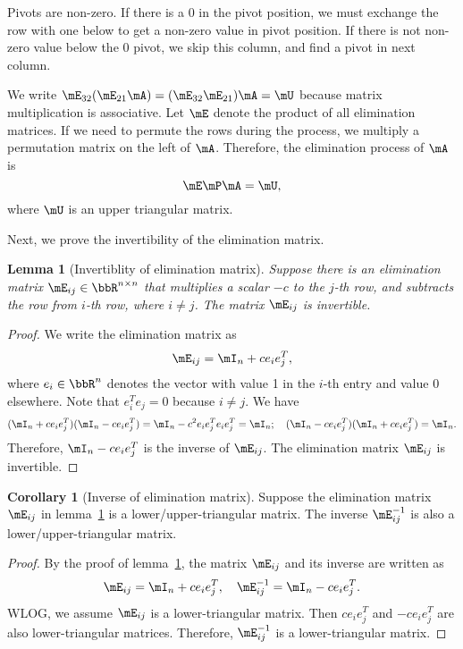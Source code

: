 \documentclass[11pt]{article}
\theoremstyle{plain}
\newtheorem{lem}{Lemma}
\theoremstyle{definition}
\newtheorem{cor}{Corollary}
\begin{document}
Pivots are non-zero. If there is a 0 in the pivot position, we must exchange the row with one below to get a non-zero value in pivot position. If there is not non-zero value below the 0 pivot, we skip this column, and find a pivot in next column. 

\vspace{.2cm}
We write $\mE_{32} (\mE_{21} \mA) = (\mE_{32} \mE_{21} ) \mA = \mU$ because matrix multiplication is associative. Let $\mE$ denote the product of all elimination matrices. If we need to permute the rows during the process, we multiply a permutation matrix on the left of $\mA$. Therefore, the elimination process of $\mA$ is
\begin{equation}\label{eq:factor}
	\mE \mP \mA = \mU,
\end{equation}
 where  $\mU$ is an upper triangular matrix.


\vspace{.2cm}
Next, we prove the invertibility of the elimination matrix.
\begin{lem}[Invertiblity of elimination matrix]\label{lem:elim}
 Suppose there is an elimination matrix $\mE_{ij} \in \bbR^{n \times n}$ that multiplies a scalar $-c$ to the  $j$-th row, and subtracts the row from $i$-th row, where $i \neq j$. The matrix $\mE_{ij}$ is invertible.
\end{lem}
\begin{proof}
	We write the elimination matrix as
	\[ \mE_{ij} = \mI_n + c e_i e_{j}^T, \]
	where $e_i \in \bbR^n$ denotes the vector with value 1 in the $i$-th entry and value 0 elsewhere. Note that $e^T_i e_{j} = 0$ because $i \neq j$. We have 
	\[ (\mI_n + c e_i e_{j}^T)(\mI_n - c e_i e_{j}^T)  = \mI_n - c^2 e_i e_{j}^T e_i e_{j}^T = \mI_n; \quad (\mI_n - c e_i e_{j}^T)(\mI_n + c e_i e_{j}^T)= \mI_n. \]
	Therefore, $\mI_n - c e_i e_{j}^T$ is the inverse of $\mE_{ij}$. The elimination matrix $\mE_{ij}$  is invertible.
\end{proof}

\begin{cor}[Inverse of elimination matrix]\label{cor:invelim} 
Suppose the elimination matrix $\mE_{ij}$ in lemma~\ref{lem:elim} is a lower/upper-triangular matrix. The inverse $\mE_{ij}^{-1}$ is also a lower/upper-triangular matrix.
\end{cor}
\begin{proof}
	By the proof of lemma~\ref{lem:elim}, the matrix $\mE_{ij}$ and its inverse are written as
	\[ \mE_{ij} = \mI_n + c e_i e_{j}^T, \quad \mE^{-1}_{ij} = \mI_n - c e_i e_{j}^T.\]
	WLOG, we assume $\mE_{ij}$ is a lower-triangular matrix. Then $c e_i e_{j}^T$ and  $-c e_i e_{j}^T$ are also lower-triangular matrices. Therefore, $\mE_{ij}^{-1}$ is a lower-triangular matrix.
\end{proof}
\end{document}
